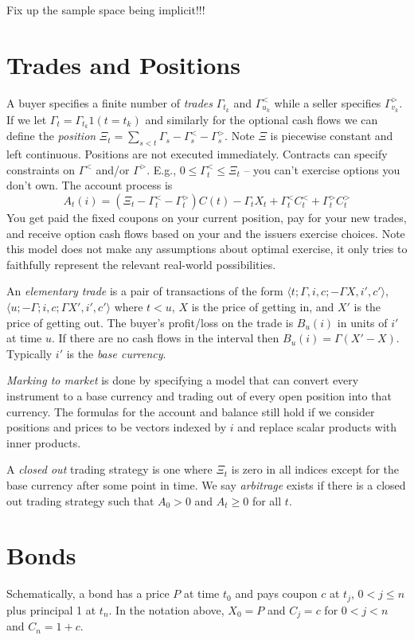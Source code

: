 \documentclass[12pt,letterpaper,fleqn]{report}
\begin{document}
Fix up the sample space being implicit!!!

\section{Trades and Positions}
A buyer specifies a finite number of {\em trades} 
\(\Gamma_{t_k}\) and \(\Gamma^<_{u_k}\)
while a seller specifies \(\Gamma^>_{v_k}\). If we let
\(\Gamma_t = \Gamma_{t_k}1(t = t_k)\) and similarly
for the optional cash flows we can
define the {\em position} \(\Xi_t = \sum_{s < t}\Gamma_s
-\Gamma^<_s - \Gamma^>_s\).
Note \(\Xi\) is piecewise constant and left continuous. Positions
are not executed immediately.
Contracts can specify constraints on \(\Gamma^<\) and/or \(\Gamma^>\).
E.g., \(0\le \Gamma^<_t\le\Xi_t\) -- you can't exercise options you
don't own.
The account process is 
\[
A_t(i) = (\Xi_t - \Gamma^<_t - \Gamma^>_t)C(t) - \Gamma_t X_t + \Gamma^<_tC^<_t + \Gamma^>_tC^>_t
\]
You get paid the fixed coupons on your current position, pay for your new trades,
and receive option cash flows based on your and the issuers exercise choices. Note
this model does not make any assumptions about optimal exercise, it only tries to
faithfully represent the relevant real-world possibilities.

An {\em elementary trade} is a pair of transactions of the form
\(\langle t;\Gamma,i,c;-\Gamma X,i',c'\rangle\), 
\(\langle u;-\Gamma;i,c;\Gamma X',i',c'\rangle\)
where \(t<u\), \(X\) is the price of getting in, and \(X'\) is the price of
getting out. The buyer's profit/loss on the trade is \(B_u(i)\) in units
of \(i'\) at time \(u\). If there are no cash flows in the interval
then \(B_u(i) = \Gamma(X' - X)\).
Typically \(i'\) is the {\em base currency}.

{\em Marking to market} is done by specifying a model that can convert every
instrument to a base currency and trading out of every open position into
that currency. The formulas for the account and balance still hold if we
consider positions and prices to be vectors indexed by \(i\) and replace scalar
products with inner products.

A {\em closed out} trading strategy is one where \(\Xi_t\) is zero in all
indices except for the base currency after some point in time. 
We say {\em arbitrage} exists if there is a closed out trading strategy such that
\(A_0 > 0\) and \(A_t \ge 0\) for all \(t\).

\section{Bonds}
Schematically, a bond has a price \(P\) at time \(t_0\) and
pays coupon \(c\) at \(t_j\), \(0<j\le n\) plus principal 1 at \(t_n\).
In the notation above, \(X_0 = P\) and \(C_j = c\) for \(0<j<n\) and \(C_n = 1 + c\).
\end{document}
